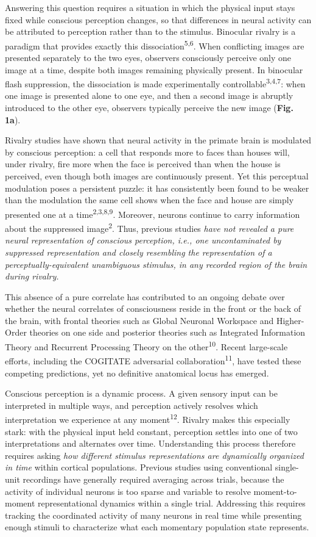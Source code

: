 \documentclass{article}
\begin{document}
Answering this question requires a situation in which the physical input stays fixed while conscious perception changes, so that differences in neural activity can be attributed to perception rather than to the stimulus. Binocular rivalry is a paradigm that provides exactly this dissociation\textsuperscript{5,6}. When conflicting images are presented separately to the two eyes, observers consciously perceive only one image at a time, despite both images remaining physically present. In binocular flash suppression, the dissociation is made experimentally controllable\textsuperscript{3,4,7}: when one image is presented alone to one eye, and then a second image is abruptly introduced to the other eye, observers typically perceive the new image (\textbf{Fig. 1a}).

Rivalry studies have shown that neural activity in the primate brain is modulated by conscious perception: a cell that responds more to faces than houses will, under rivalry, fire more when the face is perceived than when the house is perceived, even though both images are continuously present. Yet this perceptual modulation poses a persistent puzzle: it has consistently been found to be weaker than the modulation the same cell shows when the face and house are simply presented one at a time\textsuperscript{2,3,8,9}. Moreover, neurons continue to carry information about the suppressed image\textsuperscript{2}. Thus, previous studies \textit{have not revealed a pure neural representation of conscious perception, i.e., one uncontaminated by suppressed representation and closely resembling the representation of a perceptually-equivalent unambiguous stimulus, in any recorded region of the brain during rivalry.}

This absence of a pure correlate has contributed to an ongoing debate over whether the neural correlates of consciousness reside in the front or the back of the brain, with frontal theories such as Global Neuronal Workspace and Higher-Order theories on one side and posterior theories such as Integrated Information Theory and Recurrent Processing Theory on the other\textsuperscript{10}. Recent large-scale efforts, including the COGITATE adversarial collaboration\textsuperscript{11}, have tested these competing predictions, yet no definitive anatomical locus has emerged.

Conscious perception is a dynamic process. A given sensory input can be interpreted in multiple ways, and perception actively resolves which interpretation we experience at any moment\textsuperscript{12}. Rivalry makes this especially stark: with the physical input held constant, perception settles into one of two interpretations and alternates over time. Understanding this process therefore requires asking \textit{how different stimulus representations are dynamically organized in time} within cortical populations. Previous studies using conventional single-unit recordings have generally required averaging across trials, because the activity of individual neurons is too sparse and variable to resolve moment-to-moment representational dynamics within a single trial. Addressing this requires tracking the coordinated activity of many neurons in real time while presenting enough stimuli to characterize what each momentary population state represents.
\end{document}
